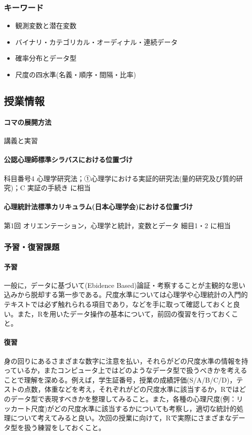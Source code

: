 \subsubsection{キーワード}
\begin{itemize}
	\item 観測変数と潜在変数
	\item バイナリ・カテゴリカル・オーディナル・連続データ
	\item 確率分布とデータ型
	\item 尺度の四水準(名義・順序・間隔・比率)
\end{itemize}

\subsection{授業情報}
\paragraph{コマの展開方法}
講義と実習
\paragraph{公認心理師標準シラバスにおける位置づけ}
科目番号4 心理学研究法；①心理学における実証的研究法(量的研究及び質的研究)；C 実証の手続き に相当
\paragraph{心理統計法標準カリキュラム(日本心理学会)における位置づけ}
第1回 オリエンテーション，心理学と統計，変数とデータ 細目1・2 に相当
\subsubsection{予習・復習課題}
\paragraph{予習}
一般に，データに基づいて(Ebidence Based)論証・考察することが主観的な思い込みから脱却する第一歩である。尺度水準については心理学や心理統計の入門的テキストでは必ず触れられる項目であり，\textcite{Miura201705,Kawabata201408,Yamada2004,kosugi2018,kosugi2019}などを手に取って確認しておくと良い。また，Rを用いたデータ操作の基本について，前回の復習を行っておくこと。
\paragraph{復習}
身の回りにあるさまざまな数字に注意を払い，それらがどの尺度水準の情報を持っているか，またコンピュータ上ではどのようなデータ型で扱うべきかを考えることで理解を深める。例えば，学生証番号，授業の成績評価(S/A/B/C/D)，テストの点数，体重などを考え，それぞれがどの尺度水準に該当するか，Rではどのデータ型で表現すべきかを整理してみること。また，各種の心理尺度(例：リッカート尺度)がどの尺度水準に該当するかについても考察し，適切な統計的処理について考えてみると良い。次回の授業に向けて，Rで実際にさまざまなデータ型を扱う練習をしておくこと。